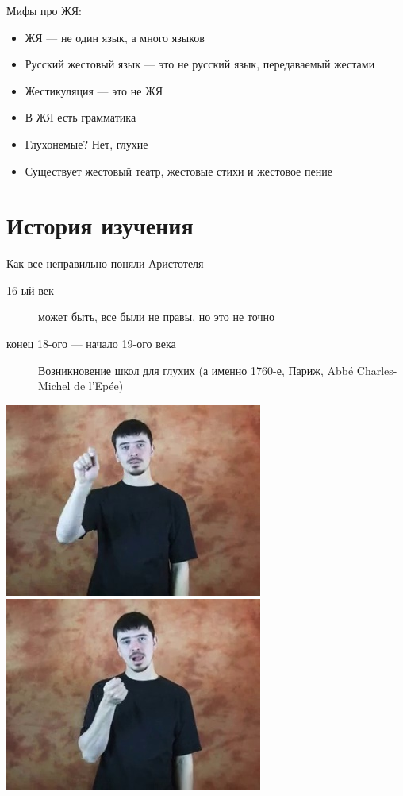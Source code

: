 \documentclass[13pt, t]{beamer}
\begin{document}
\begin{frame}{Мифы про ЖЯ:}
\begin{itemize}
    \item ЖЯ --- не один язык, а много языков 
    \item Русский жестовый язык --- это не русский язык, передаваемый жестами 
    \item Жестикуляция --- это не ЖЯ \pause
    \item В ЖЯ есть грамматика \pause
    \item Глухонемые? Нет, глухие \pause
    \item Существует жестовый театр, жестовые стихи и жестовое пение
\end{itemize}
\end{frame}

\section{История изучения} %

\begin{frame}{Как все неправильно поняли Аристотеля}
    \begin{description}
        \item[16-ый век] может быть, все были не правы, но это не точно \pause
        \item[конец 18-ого --- начало 19-ого века] Возникновение школ для глухих (а именно 1760-е, Париж, Abbé Charles-Michel de l’Epée)
    \end{description}
    \includegraphics[width=0.49\linewidth]{images/delepe}
    \includegraphics[width=0.49\linewidth]{images/delepe2}
\end{frame}
\end{document}
